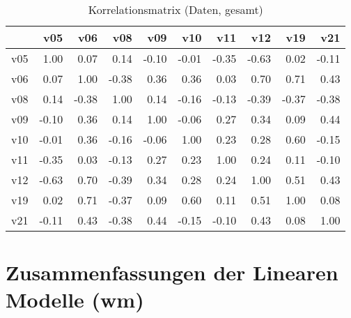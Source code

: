 \begin{table}[h!]
\begin{center}
\begin{tabular}{rrrrrrrrrr}
  \hline
 & v05 & v06 & v08 & v09 & v10 & v11 & v12 & v19 & v21 \\ 
  \hline
v05 & 1.00 & 0.07 & 0.14 & -0.10 & -0.01 & -0.35 & -0.63 & 0.02 & -0.11 \\ 
  v06 & 0.07 & 1.00 & -0.38 & 0.36 & 0.36 & 0.03 & 0.70 & 0.71 & 0.43 \\ 
  v08 & 0.14 & -0.38 & 1.00 & 0.14 & -0.16 & -0.13 & -0.39 & -0.37 & -0.38 \\ 
  v09 & -0.10 & 0.36 & 0.14 & 1.00 & -0.06 & 0.27 & 0.34 & 0.09 & 0.44 \\ 
  v10 & -0.01 & 0.36 & -0.16 & -0.06 & 1.00 & 0.23 & 0.28 & 0.60 & -0.15 \\ 
  v11 & -0.35 & 0.03 & -0.13 & 0.27 & 0.23 & 1.00 & 0.24 & 0.11 & -0.10 \\ 
  v12 & -0.63 & 0.70 & -0.39 & 0.34 & 0.28 & 0.24 & 1.00 & 0.51 & 0.43 \\ 
  v19 & 0.02 & 0.71 & -0.37 & 0.09 & 0.60 & 0.11 & 0.51 & 1.00 & 0.08 \\ 
  v21 & -0.11 & 0.43 & -0.38 & 0.44 & -0.15 & -0.10 & 0.43 & 0.08 & 1.00 \\ 
   \hline
\end{tabular}
\caption{Korrelationsmatrix (Daten, gesamt)}
\end{center}
\end{table}







\section{Zusammenfassungen der Linearen Modelle (wm)}


